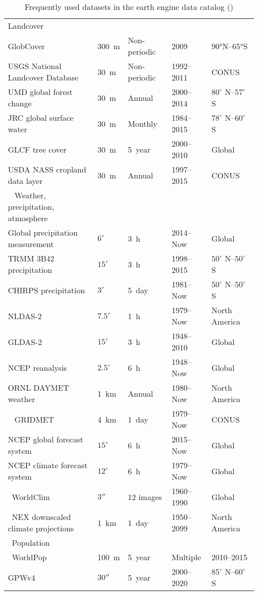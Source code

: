 \begin{table}[h]
\begin{tabularx}{\textwidth}{|l|X|X|X|X|}
		 Landcover		& & & & \\			
		 GlobCover	&300 m	&Non-periodic	&2009&	90°N–65°S\\
		 USGS National Landcover Database&	30 m	&Non-periodic	&1992–2011&	CONUS\\
		 UMD global forest change&	30 m&	Annual	&2000–2014&	$80^\circ$ N–$57^\circ$ S\\
		 JRC global surface water&	30 m&	Monthly	&1984–2015	&$78^\circ$ N–$60^\circ$ S\\
		 GLCF tree cover&	30 m	&5 year	&2000–2010	&Global\\
		 USDA NASS cropland data layer&	30 m&	Annual&	1997–2015&	CONUS\\
		  
		 Weather, precipitation, atmosphere	& & & & \\				
		 Global precipitation measurement& 	$6'$& 	3 h	& 2014–Now& 	Global\\
		 TRMM 3B42 precipitation& 	$15'$& 	3 h	& 1998–2015	& $50^\circ$ N–$50^\circ$ S\\
		 CHIRPS precipitation& 	$3'$& 	5 day& 	1981–Now& 	$50^\circ$ N–$50^\circ$ S\\
		 NLDAS-2& 	$7.5'$& 	1 h	& 1979–Now	& North America\\
		 GLDAS-2& 	$15'$& 	3 h	& 1948–2010	& Global\\
		 NCEP reanalysis& 	$2.5^\circ$ & 	6 h	& 1948–Now& 	Global\\
		 ORNL DAYMET weather& 	1 km& 	Annual& 1980–Now& 	North America\\
		  
		 GRIDMET&	4 km&	1 day&	1979–Now&	CONUS\\
		 NCEP global forecast system&	$15'$&	6 h&	2015–Now&	Global\\
		 NCEP climate forecast system&	$12'$	&6 h&	1979–Now&	Global\\
		 WorldClim	&$3''$ &	12 images&	1960–1990&	Global\\
		 NEX downscaled climate projections&	1 km&	1 day&	1950–2099&	North America\\
		 Population		& & & & \\		
		 WorldPop	&100 m	&5 year	&Multiple	& 2010–2015\\
		 GPWv4	& $30''$ &	5 year&	2000–2020&	$85^\circ$ N–$60^\circ$ S\\
		\hline
	\end{tabularx}
	\caption{Frequently used datasets in the earth engine data catalog (\cite{gorelick2017google})}
	\label{dependencies}
\end{table}
